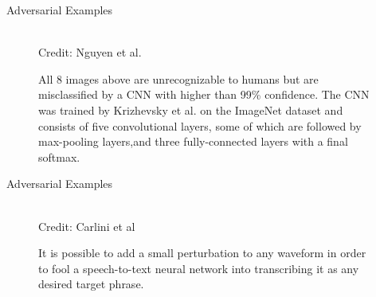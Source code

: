 \begin{frame} {Adversarial Examples}
  \begin{figure}
    \centering
       \captionsetup{font=footnotesize,labelfont=footnotesize, labelfont = bf}
      \tiny{\\Credit: Nguyen et al.}
      \caption{\footnotesize All 8 images above are unrecognizable to humans but are misclassified by a CNN with higher than 99\% confidence.  The CNN was trained by Krizhevsky et al. on the ImageNet dataset and consists of five convolutional layers, some of which are followed by max-pooling layers,and three fully-connected layers with a final softmax.}
  \end{figure}
\end{frame}

\begin{frame} {Adversarial Examples}
  \begin{figure}
    \centering
      \tiny{\\Credit: Carlini et al}
      \caption{\footnotesize  It is possible to add a small perturbation to any waveform in order to fool a speech-to-text neural network into transcribing it as any desired target phrase. 
      }
  \end{figure}
\end{frame}

